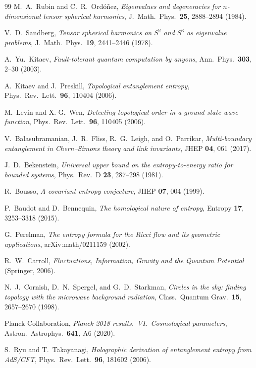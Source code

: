\documentclass[11pt,a4paper]{article}
\theoremstyle{definition}
\theoremstyle{remark}
\begin{document}
\begin{thebibliography}{99}
M.~A.~Rubin and C.~R.~Ord\'o\~nez,
\emph{Eigenvalues and degeneracies for $n$-dimensional tensor spherical harmonics},
J.\ Math.\ Phys.\ \textbf{25}, 2888--2894 (1984).

V.~D.~Sandberg, \emph{Tensor spherical harmonics on $S^{2}$ and $S^{3}$ as eigenvalue
problems}, J.\ Math.\ Phys.\ \textbf{19}, 2441--2446 (1978).

A.~Yu.~Kitaev, \emph{Fault-tolerant quantum computation by anyons},
Ann.\ Phys.\ \textbf{303}, 2--30 (2003).

A.~Kitaev and J.~Preskill, \emph{Topological entanglement entropy},
Phys.\ Rev.\ Lett.\ \textbf{96}, 110404 (2006).

M.~Levin and X.-G.~Wen, \emph{Detecting topological order in a ground state wave function},
Phys.\ Rev.\ Lett.\ \textbf{96}, 110405 (2006).


V.~Balasubramanian, J.~R.~Fliss, R.~G.~Leigh, and O.~Parrikar,
\emph{Multi-boundary entanglement in Chern--Simons theory and link invariants},
JHEP \textbf{04}, 061 (2017).

J.~D.~Bekenstein, \emph{Universal upper bound on the entropy-to-energy ratio for bounded systems},
Phys.\ Rev.\ D \textbf{23}, 287--298 (1981).

R.~Bousso, \emph{A covariant entropy conjecture}, JHEP \textbf{07}, 004 (1999).

P.~Baudot and D.~Bennequin, \emph{The homological nature of entropy},
Entropy \textbf{17}, 3253--3318 (2015).

G.~Perelman, \emph{The entropy formula for the Ricci flow and its geometric applications},
arXiv:math/0211159 (2002).

R.~W.~Carroll, \emph{Fluctuations, Information, Gravity and the Quantum Potential}
(Springer, 2006).

N.~J.~Cornish, D.~N.~Spergel, and G.~D.~Starkman,
\emph{Circles in the sky: finding topology with the microwave background radiation},
Class.\ Quantum Grav.\ \textbf{15}, 2657--2670 (1998).

Planck Collaboration, \emph{Planck 2018 results.\ VI.\ Cosmological parameters},
Astron.\ Astrophys.\ \textbf{641}, A6 (2020).


S.~Ryu and T.~Takayanagi, \emph{Holographic derivation of entanglement entropy from AdS/CFT},
Phys.\ Rev.\ Lett.\ \textbf{96}, 181602 (2006).


\end{thebibliography}
\end{document}
